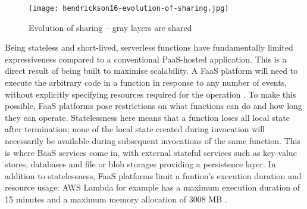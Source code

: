 \begin{figure}[h]
  \centering
  \texttt{[image: hendrickson16-evolution-of-sharing.jpg]}
  \caption{Evolution of sharing -- gray layers are shared \parencite{hendrickson16openlambda}}
  \label{fig:evolutionOfSharing}
\end{figure}

Being stateless and short-lived, serverless functions have fundamentally limited expressiveness compared to a conventional PaaS-hosted application. This is a direct result of being built to maximise scalability. A FaaS platform will need to execute the arbitrary code in a function in response to any number of events, without explicitly specifying resources required for the operation \parencite{buyya2017manifesto}. To make this possible, FaaS platforms pose restrictions on what functions can do and how long they can operate. Statelessness here means that a function loses all local state after termination; none of the local state created during invocation will necessarily be available during subsequent invocations of the same function. This is where BaaS services come in, with external stateful services such as key-value stores, databases and file or blob storages providing a persistence layer. In addition to statelessness, FaaS platforms limit a funtion's execution duration and resource usage: AWS Lambda for example has a maximum execution duration of 15 minutes and a maximum memory allocation of 3008 MB \parencite{awslambda0218}.

